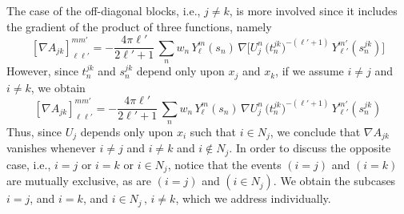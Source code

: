 The case of the off-diagonal blocks, i.e., $j \not=k$, is more involved since it includes the gradient of the product of three functions, namely
\begin{equation}\label{eq:7}
{[\nabla A_{jk}]}_{\ell \ell'}^{mm'} = -  \frac{4 \pi \ell'}{2 \ell'+1} \, \sum_{n} w_n\, Y_\ell^m(s_n) \,\nabla \Big[ U_j^n  \,  \big( t_n^{jk}\big)^{-(\ell'+1)} \, Y_{\ell'}^{m'} (s_n^{jk}) \Big]
\end{equation}
However, since $t_n^{jk}$ and $s_n^{jk}$ depend only upon $x_j$ and $x_k$, if we assume $i \not=j$ and $i\not=k$, we obtain
\begin{equation}\label{eq:8}
{[\nabla A_{jk}]}_{\ell \ell'}^{mm'} = -  \frac{4 \pi \ell'}{2 \ell'+1} \, \sum_{n} w_n\, Y_\ell^m(s_n) \,\nabla U_j^n  \,  \big( t_n^{jk}\big)^{-(\ell'+1)} \, Y_{\ell'}^{m'} (s_n^{jk})
\end{equation}
Thus, since $U_j$ depends only upon $x_i$ such that $i \in N_j$, we conclude that $\nabla A_{jk}$ vanishes whenever $i \not= j$ and $i \not=k$ and $i \not\in N_j$. In order to discuss the opposite case, i.e., $i = j$ or $i =k$ or $i \in N_j$, notice that the events $(i = j)$ and $(i = k)$ are mutually exclusive, as are $(i = j)$ and $(i \in N_j)$. We obtain the subcases $i = j$, and $i = k$, and $i \in N_j \, , \, i \not= k$, which we address individually.

